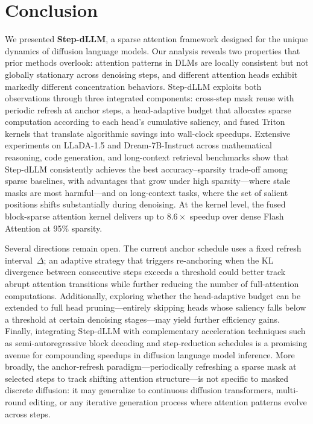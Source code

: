 \section{Conclusion}

We presented \textbf{Step-dLLM}, a sparse attention framework designed for the unique dynamics of diffusion language models. Our analysis reveals two properties that prior methods overlook: attention patterns in DLMs are locally consistent but not globally stationary across denoising steps, and different attention heads exhibit markedly different concentration behaviors. Step-dLLM exploits both observations through three integrated components: cross-step mask reuse with periodic refresh at anchor steps, a head-adaptive budget that allocates sparse computation according to each head's cumulative saliency, and fused Triton kernels that translate algorithmic savings into wall-clock speedups. Extensive experiments on LLaDA-1.5 and Dream-7B-Instruct across mathematical reasoning, code generation, and long-context retrieval benchmarks show that Step-dLLM consistently achieves the best accuracy--sparsity trade-off among sparse baselines, with advantages that grow under high sparsity---where stale masks are most harmful---and on long-context tasks, where the set of salient positions shifts substantially during denoising. At the kernel level, the fused block-sparse attention kernel delivers up to $8.6\times$ speedup over dense Flash Attention at 95\% sparsity.

Several directions remain open. The current anchor schedule uses a fixed refresh interval~$\Delta$; an adaptive strategy that triggers re-anchoring when the KL divergence between consecutive steps exceeds a threshold could better track abrupt attention transitions while further reducing the number of full-attention computations. Additionally, exploring whether the head-adaptive budget can be extended to full head pruning---entirely skipping heads whose saliency falls below a threshold at certain denoising stages---may yield further efficiency gains. Finally, integrating Step-dLLM with complementary acceleration techniques such as semi-autoregressive block decoding and step-reduction schedules is a promising avenue for compounding speedups in diffusion language model inference. More broadly, the anchor-refresh paradigm---periodically refreshing a sparse mask at selected steps to track shifting attention structure---is not specific to masked discrete diffusion: it may generalize to continuous diffusion transformers, multi-round editing, or any iterative generation process where attention patterns evolve across steps.
